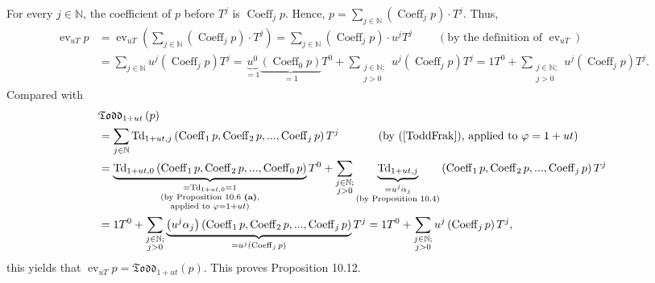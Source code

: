 \documentclass[numbers=enddot,12pt,final,onecolumn,notitlepage]{scrartcl}%
\begin{document}
For every $j\in\mathbb{N}$, the coefficient of $p$ before $T^{j}$ is
$\operatorname*{Coeff}\nolimits_{j}p$. Hence, $p=\sum\limits_{j\in\mathbb{N}%
}\left(  \operatorname*{Coeff}\nolimits_{j}p\right)  \cdot T^{j}$. Thus,
\begin{align*}
\operatorname*{ev}\nolimits_{uT}p  &  =\operatorname*{ev}\nolimits_{uT}\left(
\sum\limits_{j\in\mathbb{N}}\left(  \operatorname*{Coeff}\nolimits_{j}%
p\right)  \cdot T^{j}\right)  =\sum\limits_{j\in\mathbb{N}}\left(
\operatorname*{Coeff}\nolimits_{j}p\right)  \cdot u^{j}T^{j}%
\ \ \ \ \ \ \ \ \ \ \left(  \text{by the definition of }\operatorname*{ev}%
\nolimits_{uT}\right) \\
&  =\sum_{j\in\mathbb{N}}u^{j}\left(  \operatorname*{Coeff}\nolimits_{j}%
p\right)  T^{j}=\underbrace{u^{0}}_{=1}\underbrace{\left(
\operatorname*{Coeff}\nolimits_{0}p\right)  }_{=1}T^{0}+\sum_{\substack{j\in
\mathbb{N};\\j>0}}u^{j}\left(  \operatorname*{Coeff}\nolimits_{j}p\right)
T^{j}=1T^{0}+\sum_{\substack{j\in\mathbb{N};\\j>0}}u^{j}\left(
\operatorname*{Coeff}\nolimits_{j}p\right)  T^{j}.
\end{align*}
Compared with%
\begin{align*}
&  \mathfrak{Todd}_{1+ut}\left(  p\right) \\
&  =\sum_{j\in\mathbb{N}}\operatorname*{Td}\nolimits_{1+ut,j}\left(
\operatorname*{Coeff}\nolimits_{1}p,\operatorname*{Coeff}\nolimits_{2}%
p,...,\operatorname*{Coeff}\nolimits_{j}p\right)  T^{j}%
\ \ \ \ \ \ \ \ \ \ \left(  \text{by (\ref{ToddFrak}), applied to }%
\varphi=1+ut\right) \\
&  =\underbrace{\operatorname*{Td}\nolimits_{1+ut,0}\left(
\operatorname*{Coeff}\nolimits_{1}p,\operatorname*{Coeff}\nolimits_{2}%
p,...,\operatorname*{Coeff}\nolimits_{0}p\right)  }%
_{\substack{=\operatorname*{Td}\nolimits_{1+ut,0}=1\\\text{(by Proposition
10.6 \textbf{(a)},}\\\text{applied to }\varphi=1+ut\text{)}}}T^{0}%
+\sum_{\substack{j\in\mathbb{N};\\j>0}}\underbrace{\operatorname*{Td}%
\nolimits_{1+ut,j}}_{\substack{=u^{j}\alpha_{j}\\\text{(by Proposition 10.4)}%
}}\left(  \operatorname*{Coeff}\nolimits_{1}p,\operatorname*{Coeff}%
\nolimits_{2}p,...,\operatorname*{Coeff}\nolimits_{j}p\right)  T^{j}\\
&  =1T^{0}+\sum_{\substack{j\in\mathbb{N};\\j>0}}\underbrace{\left(
u^{j}\alpha_{j}\right)  \left(  \operatorname*{Coeff}\nolimits_{1}%
p,\operatorname*{Coeff}\nolimits_{2}p,...,\operatorname*{Coeff}\nolimits_{j}%
p\right)  }_{=u^{j}\left(  \operatorname*{Coeff}\nolimits_{j}p\right)  }%
T^{j}=1T^{0}+\sum_{\substack{j\in\mathbb{N};\\j>0}}u^{j}\left(
\operatorname*{Coeff}\nolimits_{j}p\right)  T^{j},
\end{align*}
this yields that $\operatorname*{ev}\nolimits_{uT}p=\mathfrak{Todd}%
_{1+ut}\left(  p\right)  $. This proves Proposition 10.12.
\end{document}

